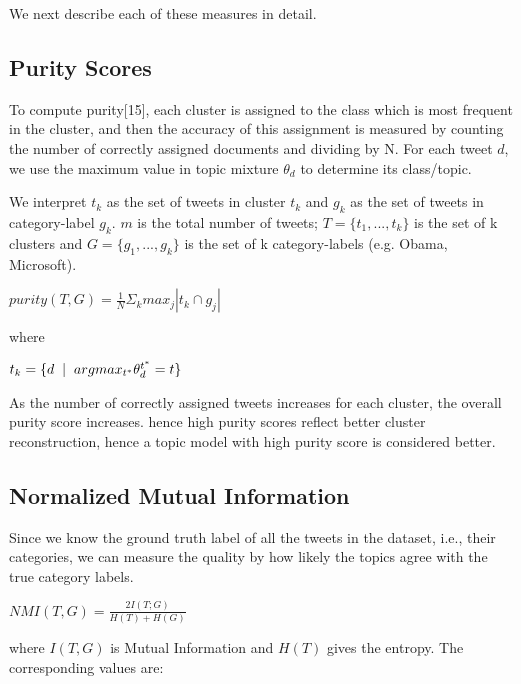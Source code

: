 \documentclass[10pt,a5paper,twoside]{article}
\begin{document}
We next describe each of these measures in detail.


\subsection{Purity Scores}
To compute purity[15], each cluster is assigned to the class which is most frequent in the cluster, and then the accuracy of this assignment is measured by counting the number of correctly assigned documents and dividing by N. For each tweet $d$, we use the maximum value in topic mixture $\theta_{d} $ to determine its class/topic.

We interpret $t_{k}$ as the set of tweets in cluster $t_{k}$ and $g_{k}$ as the set of tweets in category-label $g_{k}$. $m$ is the total number of tweets; $T = \lbrace t_{1}, ... , t_{k} \rbrace$ is the set of k clusters and $ G = \lbrace g_{1}, ... , g_{k}\rbrace $ is the set of k category-labels (e.g. Obama, Microsoft).

\begin{center}
$ purity (T,G) = \frac{1}{N} \Sigma_{k} max_{j} |t_{k} \cap g_{j}|$
\end{center}

where

\begin{center}
$ t_k = \lbrace  d \hspace{2 mm} |  \hspace{2 mm} argmax_{t^*} \theta^{t^{*}}_d = t \rbrace $
\end{center}

As the number of correctly assigned tweets increases for each cluster, the overall purity score increases. hence high purity scores reflect better cluster reconstruction, hence a topic model with high purity score is considered better.
\\

\subsection{Normalized Mutual Information}
Since we know the ground truth label of all the tweets in the dataset, i.e., their categories, we can measure the quality by how likely the topics agree with the true category labels. 
\begin{center}
$NMI(T,G) = \frac{2 I(T;G)}{H(T) + H(G)} $
\end{center}
where $I(T,G)$ is Mutual Information and $H(T)$ gives the entropy. The 
corresponding values are:
\end{document}

